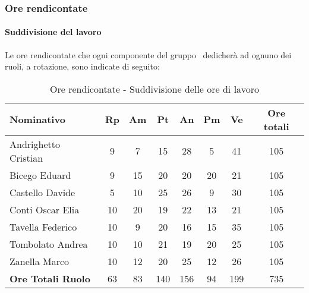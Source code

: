 \documentclass[../PianoProgetto.tex]{subfiles}
\begin{document}
	\subsubsection{Ore rendicontate}
				\paragraph{Suddivisione del lavoro}
					Le ore rendicontate che ogni componente del gruppo \leaf\ dedicherà ad ognuno dei ruoli, a rotazione, sono indicate di seguito:
	
	\begin{table}[h]
		\begin{tabularx}{\textwidth}{l  * {6}{C}  c}
			\toprule
			\textbf{Nominativo} & \textbf{Rp} & \textbf{Am} & \textbf{Pt} 
						& \textbf{An} & \textbf{Pm} & \textbf{Ve} & \textbf{Ore totali} \\
			\midrule
			Andrighetto Cristian & 9 & 7 & 15 & 28 & 5 & 41 &	105 \\
			Bicego Eduard & 9 & 15 & 20 & 20 & 20 & 21 & 105 \\
			Castello Davide & 5 & 10 & 25 & 26 & 9 & 30 & 105 \\
			Conti Oscar Elia & 10 & 20 & 19 & 22 & 13 & 21 & 105 \\
			Tavella Federico &	10 & 9 & 20 & 16 & 15 & 35 & 105 \\
			Tombolato Andrea & 10 & 10 & 21 & 19 & 20 & 25 & 105 \\
			Zanella Marco & 10 & 12 & 20 & 25 & 12 & 26 & 105 \\
			\midrule			
			\textbf{Ore Totali Ruolo} & 63 & 83 & 140 & 156 & 94 & 199 & 735 \\
			\bottomrule
		\end{tabularx}
		
		\caption{Ore rendicontate - Suddivisione delle ore di lavoro}
		\label{tab:rendicontate_ore}
		
	\end{table}
	
	
\end{document}
